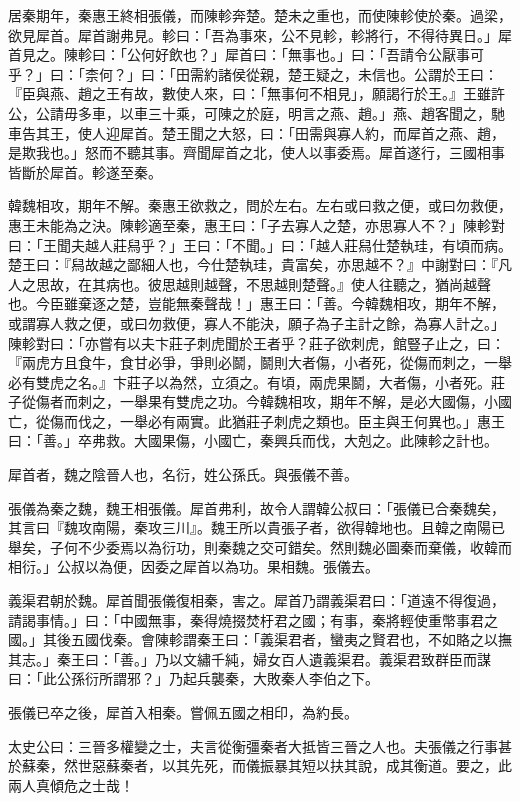 \begin{pinyinscope}
居秦期年，秦惠王終相張儀，而陳軫奔楚。楚未之重也，而使陳軫使於秦。過梁，欲見犀首。犀首謝弗見。軫曰：「吾為事來，公不見軫，軫將行，不得待異日。」犀首見之。陳軫曰：「公何好飲也？」犀首曰：「無事也。」曰：「吾請令公厭事可乎？」曰：「柰何？」曰：「田需約諸侯從親，楚王疑之，未信也。公謂於王曰：『臣與燕、趙之王有故，數使人來，曰：「無事何不相見」，願謁行於王。』王雖許公，公請毋多車，以車三十乘，可陳之於庭，明言之燕、趙。」燕、趙客聞之，馳車告其王，使人迎犀首。楚王聞之大怒，曰：「田需與寡人約，而犀首之燕、趙，是欺我也。」怒而不聽其事。齊聞犀首之北，使人以事委焉。犀首遂行，三國相事皆斷於犀首。軫遂至秦。

韓魏相攻，期年不解。秦惠王欲救之，問於左右。左右或曰救之便，或曰勿救便，惠王未能為之決。陳軫適至秦，惠王曰：「子去寡人之楚，亦思寡人不？」陳軫對曰：「王聞夫越人莊舄乎？」王曰：「不聞。」曰：「越人莊舄仕楚執珪，有頃而病。楚王曰：『舄故越之鄙細人也，今仕楚執珪，貴富矣，亦思越不？』中謝對曰：『凡人之思故，在其病也。彼思越則越聲，不思越則楚聲。』使人往聽之，猶尚越聲也。今臣雖棄逐之楚，豈能無秦聲哉！」惠王曰：「善。今韓魏相攻，期年不解，或謂寡人救之便，或曰勿救便，寡人不能決，願子為子主計之餘，為寡人計之。」陳軫對曰：「亦嘗有以夫卞莊子刺虎聞於王者乎？莊子欲刺虎，館豎子止之，曰：『兩虎方且食牛，食甘必爭，爭則必鬬，鬬則大者傷，小者死，從傷而刺之，一舉必有雙虎之名。』卞莊子以為然，立須之。有頃，兩虎果鬬，大者傷，小者死。莊子從傷者而刺之，一舉果有雙虎之功。今韓魏相攻，期年不解，是必大國傷，小國亡，從傷而伐之，一舉必有兩實。此猶莊子刺虎之類也。臣主與王何異也。」惠王曰：「善。」卒弗救。大國果傷，小國亡，秦興兵而伐，大剋之。此陳軫之計也。

犀首者，魏之陰晉人也，名衍，姓公孫氏。與張儀不善。

張儀為秦之魏，魏王相張儀。犀首弗利，故令人謂韓公叔曰：「張儀已合秦魏矣，其言曰『魏攻南陽，秦攻三川』。魏王所以貴張子者，欲得韓地也。且韓之南陽已舉矣，子何不少委焉以為衍功，則秦魏之交可錯矣。然則魏必圖秦而棄儀，收韓而相衍。」公叔以為便，因委之犀首以為功。果相魏。張儀去。

義渠君朝於魏。犀首聞張儀復相秦，害之。犀首乃謂義渠君曰：「道遠不得復過，請謁事情。」曰：「中國無事，秦得燒掇焚杅君之國；有事，秦將輕使重幣事君之國。」其後五國伐秦。會陳軫謂秦王曰：「義渠君者，蠻夷之賢君也，不如賂之以撫其志。」秦王曰：「善。」乃以文繡千純，婦女百人遺義渠君。義渠君致群臣而謀曰：「此公孫衍所謂邪？」乃起兵襲秦，大敗秦人李伯之下。

張儀已卒之後，犀首入相秦。嘗佩五國之相印，為約長。

太史公曰：三晉多權變之士，夫言從衡彊秦者大抵皆三晉之人也。夫張儀之行事甚於蘇秦，然世惡蘇秦者，以其先死，而儀振暴其短以扶其說，成其衡道。要之，此兩人真傾危之士哉！


\end{pinyinscope}